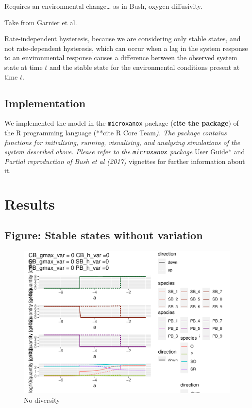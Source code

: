 \documentclass{article}
\begin{document}
Requires an environmental change\ldots{} as in Bush, oxygen diffusivity.

Take from Garnier et al.

Rate-independent hysteresis, because we are considering only stable
states, and not rate-dependent hysteresis, which can occur when a lag in
the system response to an environmental response causes a difference
between the observed system state at time \(t\) and the stable state for
the environmental conditions present at time \(t\).

\hypertarget{implementation}{%
\subsection{Implementation}\label{implementation}}

We implemented the model in the \texttt{microxanox} package
(\textbf{cite the package}) of the R programming language (**cite R Core
Team\emph{). The package contains functions for initialising, running,
visualising, and analysing simulations of the system described above.
Please refer to the \texttt{microxanox} package} User Guide* and
\emph{Partial reproduction of Bush et al (2017)} vignettes for further
information about it.

\hypertarget{results}{%
\section{Results}\label{results}}

\hypertarget{figure-stable-states-without-variation}{%
\subsection{Figure: Stable states without
variation}\label{figure-stable-states-without-variation}}

\begin{figure}

{\centering \includegraphics[width=1\linewidth]{article_files/figure-latex/ss_novar-1} 

}

\caption{No diversity}\label{fig:ss_novar}
\end{figure}
\end{document}
